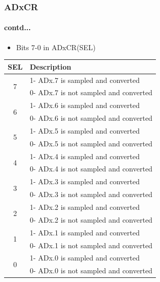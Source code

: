 \documentclass[table,10pt,red]{beamer}
\begin{document}
\begin{frame}
	\frametitle{ADxCR} \pause
	\framesubtitle{contd...}  \pause
	\begin{itemize}
		\item Bits 7-0 in ADxCR(SEL)
	\end{itemize}
	\begin{table}
		\footnotesize
	\begin{tabular}{|c|l|}
		\hline  SEL &  Description  \\ 
		\hline \multirow{2}{*}{7} & \color{red}1\color{black}- ADx.7 is sampled and converted \\ 
		                          &\color{red}0\color{black}- ADx.7 is not sampled and converted \\ 
	\hline \multirow{2}{*}{6} & \color{red}1\color{black}- ADx.6 is sampled and converted \\ 
	&\color{red}0\color{black}- ADx.6 is not sampled and converted \\ 
	\hline \multirow{2}{*}{5} & \color{red}1\color{black}- ADx.5 is sampled and converted \\ 
	&\color{red}0\color{black}- ADx.5 is not sampled and converted \\ 
	\hline \multirow{2}{*}{4} & \color{red}1\color{black}- ADx.4 is sampled and converted \\ 
	&\color{red}0\color{black}- ADx.4 is not sampled and converted \\ 
	\hline \multirow{2}{*}{3} & \color{red}1\color{black}- ADx.3 is sampled and converted \\ 
	&\color{red}0\color{black}- ADx.3 is not sampled and converted \\ 
	\hline \multirow{2}{*}{2} & \color{red}1\color{black}- ADx.2 is sampled and converted \\ 
	&\color{red}0\color{black}- ADx.2 is not sampled and converted \\ 
	\hline \multirow{2}{*}{1} & \color{red}1\color{black}- ADx.1 is sampled and converted \\ 
	&\color{red}0\color{black}- ADx.1 is not sampled and converted \\ 
	\hline \multirow{2}{*}{0} & \color{red}1\color{black}- ADx.0 is sampled and converted \\ 
	&\color{red}0\color{black}- ADx.0 is not sampled and converted \\ 
		\hline
	\end{tabular}
	\end{table} 
\end{frame}
\end{document}
